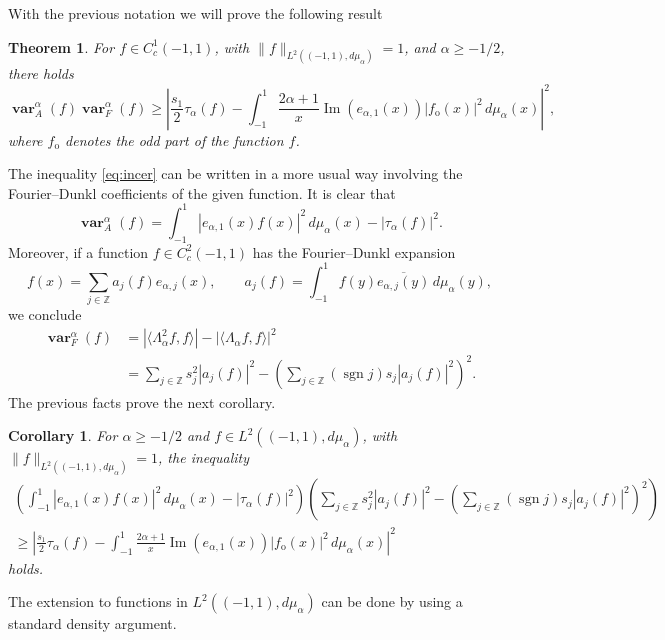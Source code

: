 \documentclass[a4paper]{amsart}
\theoremstyle{plain}
\newtheorem{Theo}{Theorem}
\newtheorem{Cor}{Corollary}
\theoremstyle{definition}
\renewcommand{\Im}{\operatorname{Im}}
\newcommand{\varneg}{\operatorname{\mathbf{var}}}
\newcommand{\sgn}{\operatorname{sgn}}
\begin{document}
With the previous notation we will prove the following result
\begin{Theo}
\label{theo:incertidumbre}
For $f\in C^1_c(-1,1)$, with $\|f\|_{L^2((-1,1),d\mu_\alpha)}=1$, and $\alpha\ge-1/2$, there holds
\begin{equation}
  \label{eq:incer}
  \varneg_A^\alpha(f)\varneg_F^\alpha(f)
  \ge \left|\frac{s_1}2 \tau_\alpha(f)
  - \int_{-1}^1 \frac{2\alpha+1}{x} \Im(e_{\alpha,1}(x)) 
  |f_{\textrm{o}}(x)|^2\,d\mu_{\alpha}(x)\right|^2,
\end{equation}
where $f_{\textrm{o}}$ denotes the odd part of the function $f$.
\end{Theo}


The inequality \eqref{eq:incer} can be written in a more usual way involving the Fourier--Dunkl coefficients of the given function. It is clear that
\[
\varneg_A^\alpha(f) = \int_{-1}^1 |e_{\alpha,1}(x)f(x)|^2\,d\mu_\alpha(x)
- |\tau_{\alpha}(f)|^2.
\]
Moreover, if a function $f\in C_c^2(-1,1)$ has the Fourier--Dunkl expansion
\[
f(x) = \sum_{j\in \mathbb{Z}}a_j(f)e_{\alpha,j}(x),\qquad a_j(f)
= \int_{-1}^1 f(y)\overline{e_{\alpha,j}(y)}\,d\mu_{\alpha}(y),
\]
we conclude
\begin{align*}
\varneg_F^\alpha(f)& = |\langle \Lambda_\alpha^2 f,f\rangle|
- |\langle \Lambda_\alpha f,f\rangle|^2
\\&=
\sum_{j\in \mathbb{Z}}s_j^2|a_{j}(f)|^2
- \left(\sum_{j\in \mathbb{Z}}(\sgn j)s_j |a_j(f)|^2\right)^2.
\end{align*}
The previous facts prove the next corollary.
\begin{Cor} For $\alpha\ge -1/2$ and $f\in L^2((-1,1),d\mu_\alpha)$, with 
$\|f\|_{L^2((-1,1),d\mu_\alpha)}=1$, the inequality
\begin{multline*}
\left(\int_{-1}^1 |e_{\alpha,1}(x)f(x)|^2\,d\mu_\alpha(x)
- |\tau_{\alpha}(f)|^2\right) %
\left(\sum_{j\in \mathbb{Z}}s_j^2|a_{j}(f)|^2
- \left(\sum_{j\in \mathbb{Z}}(\sgn j )s_j |a_j(f)|^2\right)^2\right)\\
\ge \left|\frac{s_1}2 \tau_\alpha(f)
-\int_{-1}^1 \frac{2\alpha+1}{x}\Im(e_{\alpha,1}(x)) 
|f_{\textrm{o}}(x)|^2\,d\mu_{\alpha}(x)\right|^2
\end{multline*}
holds.
\end{Cor}
The extension to functions in $L^2((-1,1),d\mu_\alpha)$ can be done by using a standard density argument.
\end{document}
